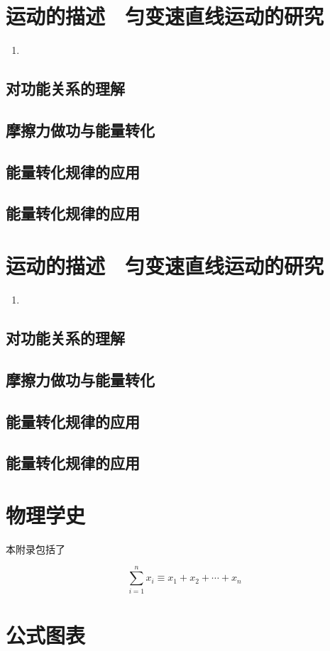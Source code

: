 \documentclass[cn,11pt]{elegantbook}
\begin{document}
\chapter{运动的描述　匀变速直线运动的研究}
\begin{enumerate}
   \item 
\end{enumerate}

\clearpage\section{对功能关系的理解}

\clearpage\section{摩擦力做功与能量转化}

\clearpage\section{能量转化规律的应用}

\clearpage\section{能量转化规律的应用}
\chapter{运动的描述　匀变速直线运动的研究}
\begin{enumerate}
   \item 
\end{enumerate}

\clearpage\section{对功能关系的理解}

\clearpage\section{摩擦力做功与能量转化}

\clearpage\section{能量转化规律的应用}

\clearpage\section{能量转化规律的应用}


\nocite{*} 



\appendix
\chapter{物理学史}

本附录包括了

\begin{equation}
\sum_{i=1}^n x_i \equiv x_1 + x_2 +\cdots + x_n
\end{equation}



\chapter{公式图表}
\end{document}

